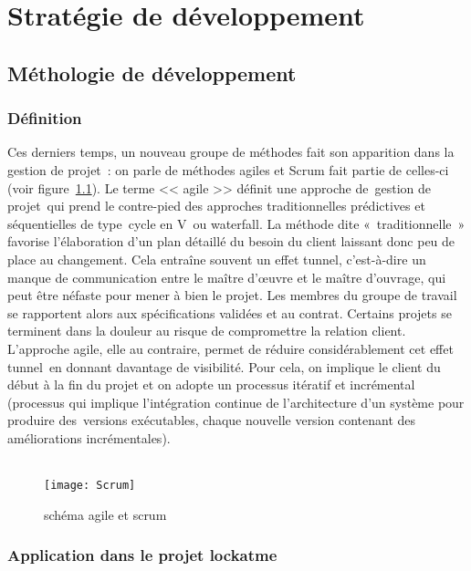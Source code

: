 \chapter{Stratégie de développement}
\newpage

\section{Méthologie de développement}
\subsection{Définition}

Ces derniers temps, un nouveau groupe de méthodes fait son apparition dans la
gestion de projet : on parle de méthodes agiles et Scrum fait partie de
celles-ci (voir figure~\ref{fig:scrum}). Le terme << agile >> définit une approche de gestion
de projet qui prend le contre-pied des approches traditionnelles prédictives et
séquentielles de type cycle en V ou waterfall.
La méthode dite « traditionnelle » favorise l’élaboration d’un plan détaillé
du besoin du client laissant donc peu de place au changement. Cela entraîne
souvent un effet tunnel, c’est-à-dire un manque de communication entre le
maître d’œuvre et le maître d’ouvrage, qui peut être néfaste pour mener à bien
le projet. Les membres du groupe de travail se rapportent alors aux
spécifications validées et au contrat. Certains projets se terminent dans la
douleur au risque de compromettre la relation client.
L’approche agile, elle au contraire, permet de réduire considérablement cet
effet tunnel en donnant davantage de visibilité. Pour cela, on implique le
client du début à la fin du projet et on adopte un processus itératif et
incrémental (processus qui implique l'intégration continue de l'architecture
d'un système pour produire des versions exécutables, chaque nouvelle version
contenant des améliorations incrémentales).
\\
\\

\begin{figure}[h]\label{fig:scrum}
  \texttt{[image: Scrum]}
  \caption{schéma agile et scrum}
  \label{fig:scrum}
\end{figure}

\subsection{Application dans le projet lockatme}

